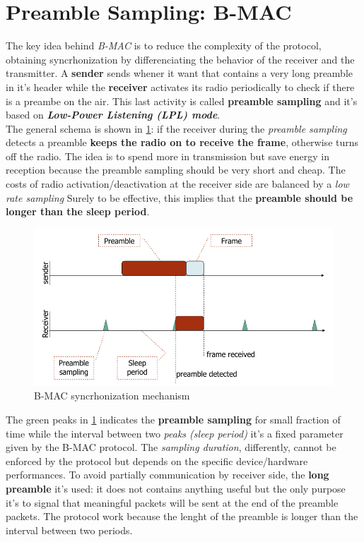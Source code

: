 \documentclass[10pt,a4paper]{report}
\theoremstyle{definition}
\begin{document}
\section{Preamble Sampling: B-MAC}\label{sec:preamble-sampling-b-mac}
The key idea behind \textit{B-MAC} is to reduce the complexity of the protocol, obtaining syncrhonization by differenciating the behavior of the receiver and the transmitter. A \textbf{sender} sends whener it want that contains a very long preamble in it's header while the \textbf{receiver} activates its radio periodically to check if there is a preambe on the air. This last activity is called \textbf{preamble sampling} and it's based on \textit{\textbf{Low-Power Listening (LPL) mode}}.\\
The general schema is shown in \ref{bmac-1}: if the receiver during the \textit{preamble sampling} detects a preamble \textbf{keeps the radio on to receive the frame}, otherwise turns off the radio.
The idea is to spend more in transmission but save energy in reception because the preamble sampling should be very short and cheap. The costs of radio activation/deactivation at the receiver side are balanced by a \textit{low rate sampling}
Surely to be effective, this implies that the \textbf{preamble should be longer than the sleep period}.
\begin{figure}[h!]
	\centering\includegraphics[scale=0.50]{images/Pasted image 20230405103750.png}
	\caption{B-MAC syncrhonization mechanism}
\label{bmac-1}
\end{figure}

The green peaks in \ref{bmac-1} indicates the \textbf{preamble sampling} for small fraction of time while the interval between two \textit{peaks (sleep period)} it's a fixed parameter given by the B-MAC protocol. The \textit{sampling duration}, differently, cannot be enforced by the protocol but depends on the specific device/hardware performances.
To avoid partially communication by receiver side, the \textbf{long preamble} it's used: it does not contains anything useful but the only purpose it's to signal that meaningful packets will be sent at the end of the preamble packets.
The protocol work because the lenght of the preamble is longer than the interval between two periods.
\end{document}
